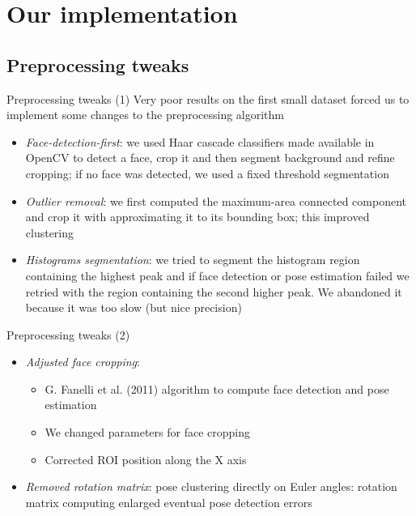 \documentclass[unknownkeysallowed]{beamer}
\begin{document}
\section{Our implementation}
\subsection{Preprocessing tweaks}
\begin{frame}{Preprocessing tweaks (1)}
	Very poor results on the first small dataset forced us to implement some changes to the preprocessing algorithm
	\begin{itemize}
		\item \textit{Face-detection-first}: we used Haar cascade classifiers made available in OpenCV to detect a face, crop it and then segment background and refine	cropping; if no face was detected, we used a fixed threshold segmentation
		\item \textit{Outlier removal}: we first computed the maximum-area connected component and crop it with approximating it to its bounding box; this improved clustering
		\item \textit{Histograms segmentation}: we tried to segment the	histogram region containing the highest peak and if face detection or pose estimation failed we retried	with the region containing the second higher peak. We abandoned it because it was too slow (but nice precision)
	\end{itemize}
\end{frame}

\begin{frame}{Preprocessing tweaks (2)}
	\begin{itemize}
		\item \textit{Adjusted face cropping}:
			\begin{itemize}
				\item G. Fanelli et al. (2011) algorithm to	compute face detection and pose estimation
				\item We changed parameters for face cropping
				\item Corrected ROI position along the X axis
			\end{itemize}
		\item \textit{Removed rotation matrix}: pose clustering	directly on Euler angles: rotation matrix computing enlarged eventual pose detection errors
	\end{itemize}
\end{frame}
\end{document}
